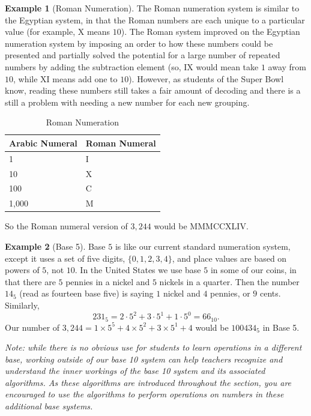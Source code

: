 \documentclass[
]{book}
\theoremstyle{definition}
\theoremstyle{definition}
\newtheorem{example}{Example}[chapter]
\theoremstyle{definition}
\theoremstyle{definition}
\theoremstyle{remark}
\begin{document}
\begin{example}[Roman Numeration]
The Roman numeration system is similar to the Egyptian system, in that the Roman numbers are each unique to a particular value (for example, X means \(10\)). The Roman system improved on the Egyptian numeration system by imposing an order to how these numbers could be presented and partially solved the potential for a large number of repeated numbers by adding the subtraction element (so, IX would mean take \(1\) away from \(10\), while XI means add one to \(10\)). However, as students of the Super Bowl know, reading these numbers still takes a fair amount of decoding and there is a still a problem with needing a new number for each new grouping.

\begin{table}

\caption{\label{tab:roman}Roman Numeration}
\centering
\begin{tabular}[t]{l|l}
\hline
Arabic Numeral & Roman Numeral\\
\hline
1 & I\\
\hline
10 & X\\
\hline
100 & C\\
\hline
1,000 & M\\
\hline
\end{tabular}
\end{table}

So the Roman numeral version of \(3,244\) would be MMMCCXLIV.
\end{example}

\begin{example}[Base 5]
Base \(5\) is like our current standard numeration system, except it uses a set of five digits, \(\{0,1,2,3,4\}\), and place values are based on powers of \(5\), not \(10\). In the United States we use base \(5\) in some of our coins, in that there are \(5\) pennies in a nickel and \(5\) nickels in a quarter. Then the number \(14_{5}\) (read as fourteen base five) is saying \(1\) nickel and \(4\) pennies, or \(9\) cents. Similarly,
\[231_{5} = 2\cdot 5^2 + 3\cdot 5^1 + 1 \cdot 5^0 = 66_{10}.\]
Our number of \(3,244 = 1\times 5^5 +4\times 5^2 + 3\times 5^1 + 4\) would be \(100434_5\) in Base 5.
\end{example}

\emph{Note: while there is no obvious use for students to learn operations in a different base, working outside of our base 10 system can help teachers recognize and understand the inner workings of the base 10 system and its associated algorithms. As these algorithms are introduced throughout the section, you are encouraged to use the algorithms to perform operations on numbers in these additional base systems.}
\end{document}
